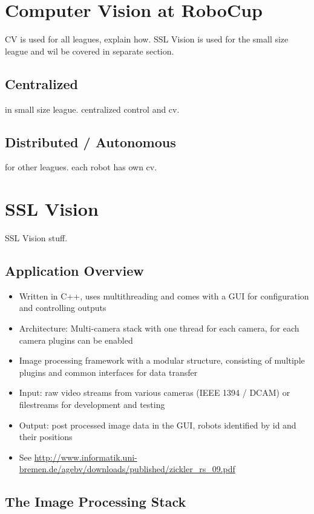 \newpage
\section{Computer Vision at RoboCup}

CV is used for all leagues, explain how.
SSL Vision is used for the small size league and wil be covered in separate
section.

\subsection{Centralized}
in small size league. centralized control and cv.

\subsection{Distributed / Autonomous}
for other leagues. each robot has own cv.




\newpage
\section{SSL Vision}
SSL Vision stuff.

\subsection{Application Overview}



\begin{itemize}
  \item Written in C++, uses multithreading and comes with a GUI for
  configuration and controlling outputs
  \item Architecture: Multi-camera stack with one thread for each camera, for each camera plugins can be enabled
  \item Image processing framework with a modular structure, consisting of multiple plugins and common interfaces for data transfer
  \item Input: raw video streams from various cameras (IEEE 1394 / DCAM) or filestreams for development and testing
  \item Output: post processed image data in the GUI, robots identified by id and their positions
  \item See
  \url{http://www.informatik.uni-bremen.de/agebv/downloads/published/zickler_rs_09.pdf}
\end{itemize}

\subsection{The Image Processing Stack}

